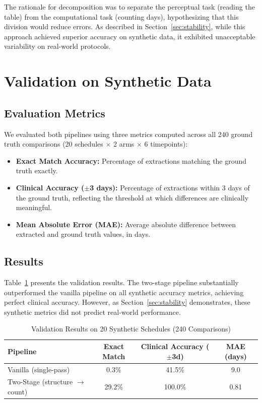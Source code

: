 \documentclass[11pt]{article}
\begin{document}
The rationale for decomposition was to separate the perceptual task (reading the table) from the computational task (counting days), hypothesizing that this division would reduce errors. As described in Section~\ref{sec:stability}, while this approach achieved superior accuracy on synthetic data, it exhibited unacceptable variability on real-world protocols.

\section{Validation on Synthetic Data}

\subsection{Evaluation Metrics}

We evaluated both pipelines using three metrics computed across all 240 ground truth comparisons (20 schedules $\times$ 2 arms $\times$ 6 timepoints):

\begin{itemize}[leftmargin=*]
    \item \textbf{Exact Match Accuracy:} Percentage of extractions matching the ground truth exactly.
    \item \textbf{Clinical Accuracy ($\pm$3 days):} Percentage of extractions within 3 days of the ground truth, reflecting the threshold at which differences are clinically meaningful.
    \item \textbf{Mean Absolute Error (MAE):} Average absolute difference between extracted and ground truth values, in days.
\end{itemize}

\subsection{Results}

Table~\ref{tab:synthetic_validation} presents the validation results. The two-stage pipeline substantially outperformed the vanilla pipeline on all synthetic accuracy metrics, achieving perfect clinical accuracy. However, as Section~\ref{sec:stability} demonstrates, these synthetic metrics did not predict real-world performance.

\begin{table}[H]
\centering
\caption{Validation Results on 20 Synthetic Schedules (240 Comparisons)}
\label{tab:synthetic_validation}
\begin{tabular}{lccc}
\toprule
\textbf{Pipeline} & \textbf{Exact Match} & \textbf{Clinical Accuracy ($\pm$3d)} & \textbf{MAE (days)} \\
\midrule
Vanilla (single-pass) & 0.3\% & 41.5\% & 9.0 \\
Two-Stage (structure $\to$ count) & 29.2\% & 100.0\% & 0.81 \\
\bottomrule
\end{tabular}
\end{table}
\end{document}
